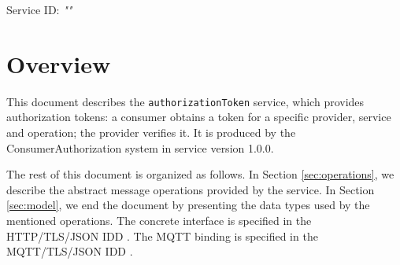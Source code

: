 \documentclass[a4paper]{arrowhead}
\begin{document}
\sloppy

\ArrowheadSetup

\begin{center}
  \vspace*{1cm}
  \huge{\arrowtitle}

  \vspace*{0.2cm}
  \LARGE{\arrowtype}
  \vspace*{1cm}

  \Large{Service ID: \textit{"\arrowid"}}

  \vspace*{\fill}


  \vspace*{1cm}
  \vspace*{\fill}

  \begin{abstract}
    This document describes the \texttt{authorizationToken} service, version 1.0.0, produced by the ConsumerAuthorization core system of Arrowhead 5.2.2.
  \end{abstract}

  \vspace*{1cm}
\end{center}

\newpage

\tableofcontents
\newpage

\section{Overview}
\label{sec:overview}

This document describes the \texttt{authorizationToken} service, which provides authorization tokens: a consumer obtains a token for a specific provider, service and operation; the provider verifies it.
It is produced by the ConsumerAuthorization system \cite{ca-sysd} in service version 1.0.0.

The rest of this document is organized as follows.
In Section \ref{sec:operations}, we describe the abstract message operations provided by the service.
In Section \ref{sec:model}, we end the document by presenting the data types used by the mentioned operations.
The concrete interface is specified in the HTTP/TLS/JSON IDD \cite{ca-authorizationToken-http-idd}. The MQTT binding is specified in the MQTT/TLS/JSON IDD \cite{ca-authorizationToken-mqtt-idd}.
\end{document}
